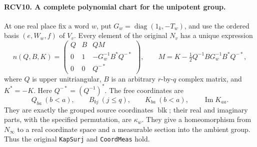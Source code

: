 \documentclass[11pt,a4paper]{article}
\numberwithin{equation}{section}
\theoremstyle{remark}\newtheorem{remark}[theorem]{Remark}
\begin{document}
\paragraph{RCV10. A complete polynomial chart for the unipotent group.}
\label{claim:RCV10}
At one real place fix a word \(w\), put
\(G_w=\operatorname{diag}(1_k,-T_w)\), and use the ordered basis
\((e,W_w,f)\) of \(V_v\).  Every element of the original
\(N_v\) has a unique expression
\[
 n(Q,B,K)=
 \begin{pmatrix}
 Q&B&QM\\
 0&1&-G_w^{-1}B^*Q^{-*}\\
 0&0&Q^{-*}
 \end{pmatrix},\qquad
 M=K-\tfrac12Q^{-1}BG_w^{-1}B^*Q^{-*},
\tag{RCV.15}
\]
where \(Q\) is upper unitriangular, \(B\) is an arbitrary
\(r\)-by-\(q\) complex matrix, and \(K^*=-K\).  Here
\(Q^{-*}=(Q^{-1})^*\).
The free coordinates are
\[
 Q_{ba}\ (b<a),\qquad B_{bj}\ (j\leq q),\qquad
 K_{ba}\ (b<a),\qquad \operatorname{Im}K_{aa}.
\tag{RCV.16}
\]
They are exactly the grouped source coordinates \(\operatorname{blk}\);
their real and imaginary parts, with the specified permutation, are
\(\kappa_w\).  They give a homeomorphism from \(N_\infty\) to a
real coordinate space and a measurable section into the ambient group.
Thus the original \texttt{Kap\allowbreak Surj} and \texttt{Coord\allowbreak Meas} hold.
\end{document}
